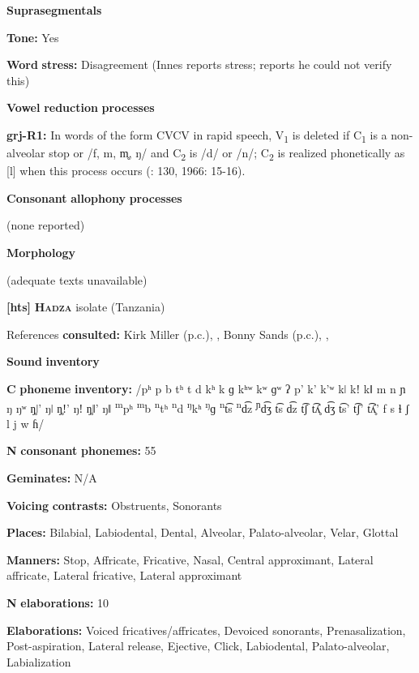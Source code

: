 \textbf{Suprasegmentals}

\textbf{Tone:} Yes

\textbf{Word} \textbf{stress:} Disagreement (Innes reports stress; \citealt{Newman1986} reports he could not verify this)

\textbf{Vowel} \textbf{reduction} \textbf{processes}

\textbf{grj-R1:} In words of the form CVCV in rapid speech, V\textsubscript{1} is deleted if C\textsubscript{1} is a non-alveolar stop or /f, m, m̥, ŋ/ and C\textsubscript{2} is /d/ or /n/; C\textsubscript{2} is realized phonetically as [l] when this process occurs (\citealt{Innes1981}: 130, 1966: 15-16).

\textbf{Consonant} \textbf{allophony} \textbf{processes}

(none reported)

\textbf{Morphology}

(adequate texts unavailable)

\textbf{[hts]}   \textbf{\textsc{Hadza}}  isolate (Tanzania)

References \textbf{consulted:} Kirk Miller (p.c.), \citet{Sands2013}, Bonny Sands (p.c.), \citet{SandsEtAl1996}, \citet{TuckerEtAl1977}

\textbf{Sound} \textbf{inventory}

\textbf{C} \textbf{phoneme} \textbf{inventory:} /pʰ p b tʰ t d kʰ k ɡ kʰʷ kʷ ɡʷ ʔ p’ k’ k’ʷ kǀ kǃ kǁ m n ɲ ŋ ŋʷ ŋ̥ǀ’ ŋǀ ŋ̥ǃ’ ŋǃ ŋ̥ǁ’ ŋǁ \textsuperscript{m}pʰ \textsuperscript{m}b \textsuperscript{n}tʰ \textsuperscript{n}d \textsuperscript{ŋ}kʰ \textsuperscript{ŋ}ɡ \textsuperscript{n}t͡s \textsuperscript{n}d͡z \textsuperscript{ɲ}d͡ʒ t͡s d͡z t͡ʃ t͡ʎ̥ d͡ʒ t͡s’ t͡ʃ’ t͡ʎ̥’ f s ɬ ʃ l j w ɦ/

\textbf{N} \textbf{consonant} \textbf{phonemes:} 55

\textbf{Geminates:} N/A

\textbf{Voicing} \textbf{contrasts:} Obstruents, Sonorants

\textbf{Places:} Bilabial, Labiodental, Dental, Alveolar, Palato-alveolar, Velar, Glottal

\textbf{Manners:} Stop, Affricate, Fricative, Nasal, Central approximant, Lateral affricate, Lateral fricative, Lateral approximant

\textbf{N} \textbf{elaborations:} 10

\textbf{Elaborations:} Voiced fricatives/affricates, Devoiced sonorants, Prenasalization, Post-aspiration, Lateral release, Ejective, Click, Labiodental, Palato-alveolar, Labialization

